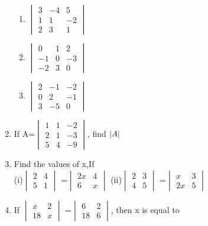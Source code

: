 \documentclass[journal,12pt,twocolumn]{IEEEtran}
\renewcommand\thesection{\arabic{section}}
\begin{document}
\begin{enumerate}[label=\thesection.\arabic*.,ref=\thesection.\theenumi]
\begin{enumerate}
\item $\begin{vmatrix}
3&-4&5\\1&1&-2\\2&3&1
\end{vmatrix}$
\\
\solution 

\item $\begin{vmatrix}
0&1&2 \\ -1&0&-3\\-2&3&0
\end{vmatrix}$
\item $\begin{vmatrix}
2&-1&-2\\0&2&-1\\3&-5&0
\end{vmatrix}$
\end{enumerate}  
\item If A=$\begin{vmatrix}1&1&-2\\2&1&-3\\5&4&-9\end{vmatrix}$, 
find $\left\vert A\right\vert$
\\
\solution 

\item Find the values of x,If\\
(i)$\begin{vmatrix}
2&4\\5&1
\end{vmatrix}$ =$\begin{vmatrix}
2x&4 \\ 6&x
\end{vmatrix}$
(ii)$\begin{vmatrix}
2&3 \\ 4&5
\end{vmatrix}$ =$\begin{vmatrix}
x&3 \\ 2x&5
\end{vmatrix}$
\\
\solution 

\item If  $\begin{vmatrix}
x&2 \\ 18&x
\end{vmatrix}$ =$\begin{vmatrix}
6&2 \\ 18&6
\end{vmatrix}$, then x is equal to 

\end{enumerate}
\end{document}
